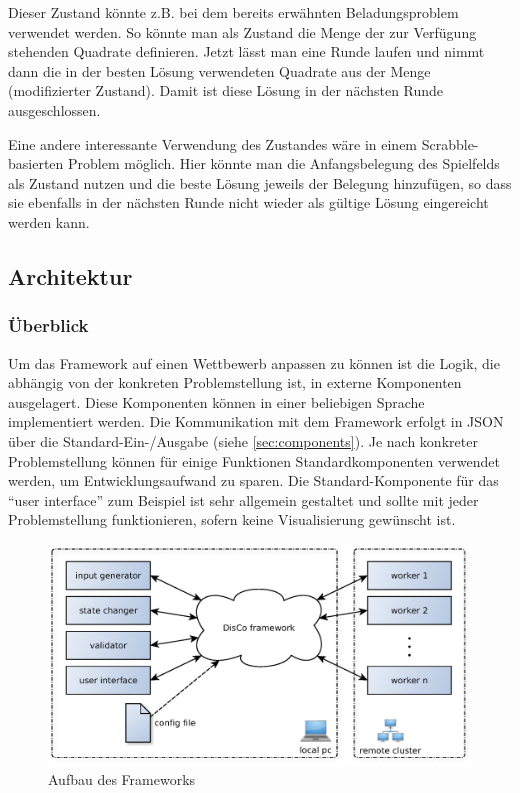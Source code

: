 \documentclass[a4paper, 12pt]{article}
\begin{document}
Dieser Zustand könnte z.B. bei dem bereits erwähnten Beladungsproblem
verwendet werden. So könnte man als Zustand die Menge der zur Verfügung
stehenden Quadrate definieren. Jetzt lässt man eine Runde laufen und nimmt
dann die in der besten Lösung verwendeten Quadrate aus der Menge (modifizierter
Zustand). Damit ist diese Lösung in der nächsten Runde ausgeschlossen.

Eine andere interessante Verwendung des Zustandes wäre in einem Scrabble-%
basierten Problem möglich. Hier könnte man die Anfangsbelegung des Spielfelds
als Zustand nutzen und die beste Lösung jeweils der Belegung hinzufügen, so dass
sie ebenfalls in der nächsten Runde nicht wieder als gültige Lösung eingereicht
werden kann.

\subsection{Architektur}

\subsubsection{Überblick}

Um das Framework auf einen Wettbewerb anpassen zu können ist die Logik, die
abhängig von der konkreten Problemstellung ist, in externe Komponenten
ausgelagert. Diese Komponenten können in einer beliebigen Sprache
implementiert werden.
Die Kommunikation mit dem Framework erfolgt in JSON über die
Standard-Ein-/Ausgabe (siehe \ref{sec:components}).
Je nach konkreter Problemstellung können für einige Funktionen
Standardkomponenten verwendet werden, um Entwicklungsaufwand zu sparen.
Die Standard-Komponente für das ``user interface'' zum Beispiel ist sehr
allgemein gestaltet und sollte mit jeder Problemstellung funktionieren, sofern
keine Visualisierung gewünscht ist.

\begin{figure}[ht]
  \centering
  \includegraphics[width=\textwidth]{overview}
  \caption{Aufbau des Frameworks}
\end{figure}
\end{document}
